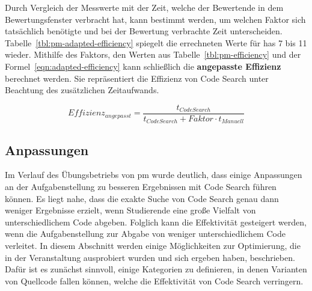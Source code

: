 Durch Vergleich der Messwerte mit der Zeit, welche der Bewertende in dem Bewertungsfenster verbracht hat, kann bestimmt werden, um welchen Faktor sich tatsächlich benötigte und bei der Bewertung verbrachte Zeit unterscheiden.
Tabelle~\ref{tbl:pm-adapted-efficiency} spiegelt die errechneten Werte für \acp{ha} 7 bis 11 wieder.
Mithilfe des Faktors, den Werten aus Tabelle~\ref{tbl:pm-efficiency} und der Formel~\ref{eqn:adapted-efficiency} kann schließlich die \textbf{angepasste Effizienz} berechnet werden.
Sie repräsentiert die Effizienz von Code Search unter Beachtung des zusätzlichen Zeitaufwands.

\begin{equation}\label{eqn:adapted-efficiency}
    Effizienz_{angepasst} = \frac{t_{Code Search}}{t_{Code Search} + Faktor \cdot t_{Manuell}}
\end{equation}

\subsection{Anpassungen}\label{subsec:pm-adaptations}

Im Verlauf des Übungsbetriebs von \ac{pm} wurde deutlich, dass einige Anpassungen an der Aufgabenstellung zu besseren Ergebnissen mit Code Search führen können.
Es liegt nahe, dass die exakte Suche von Code Search genau dann weniger Ergebnisse erzielt, wenn Studierende eine große Vielfalt von unterschiedlichem Code abgeben.
Folglich kann die Effektivität gesteigert werden, wenn die Aufgabenstellung zur Abgabe von weniger unterschiedlichem Code verleitet.
In diesem Abschnitt werden einige Möglichkeiten zur Optimierung, die in der Veranstaltung ausprobiert wurden und sich ergeben haben, beschrieben.
Dafür ist es zunächst sinnvoll, einige Kategorien zu definieren, in denen Varianten von Quellcode fallen können, welche die Effektivität von Code Search verringern.

